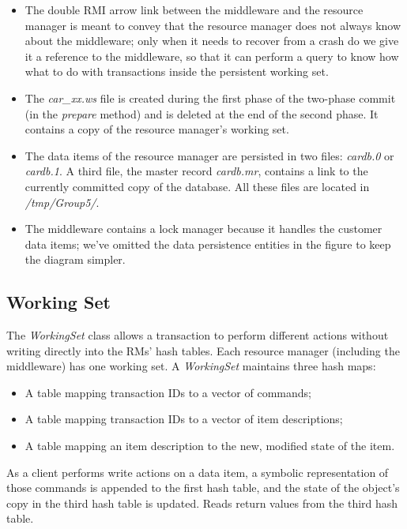 \documentclass[11pt]{article}
\begin{document}
\begin{itemize}
  \item The double RMI arrow link between the middleware and the
    resource manager is meant to convey that the resource manager does
    not always know about the middleware; only when it needs to
    recover from a crash do we give it a reference to the middleware,
    so that it can perform a query to know how what to do with
    transactions inside the persistent working set.
  \item The {\it car\_xx.ws} file is created during the first phase of
    the two-phase commit (in the {\it prepare} method) and is deleted
    at the end of the second phase.  It contains a copy of the
    resource manager's working set.
  \item The data items of the resource manager are persisted in two
    files: {\it cardb.0} or {\it cardb.1}.  A third file, the master
    record {\it cardb.mr}, contains a link to the currently committed
    copy of the database.  All these files are located in {\it
      /tmp/Group5/}.
  \item The middleware contains a lock manager because it handles the
    customer data items; we've omitted the data persistence entities
    in the figure to keep the diagram simpler.
\end{itemize}


\subsection{Working Set}

The {\it WorkingSet} class allows a transaction to perform different
actions without writing directly into the RMs' hash tables.  Each
resource manager (including the middleware) has one working set.  A
{\it WorkingSet} maintains three hash maps:

\begin{itemize}
  \item A table mapping transaction IDs to a vector of commands;
  \item A table mapping transaction IDs to a vector of item descriptions;
  \item A table mapping an item description to the new, modified state
    of the item.
\end{itemize}

As a client performs write actions on a data item, a symbolic
representation of those commands is appended to the first hash table,
and the state of the object's copy in the third hash table is updated.
Reads return values from the third hash table.
\end{document}
